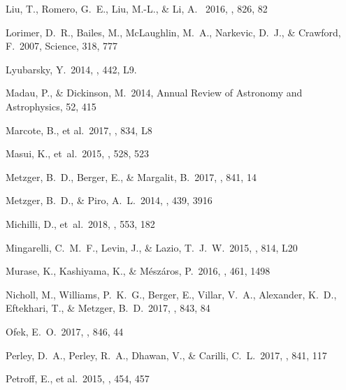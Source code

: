 \documentclass[]{pasj01}
\begin{document}
\begin{thebibliography}{10}
{Liu}, T., {Romero}, G.~E., {Liu}, M.-L., \& {Li}, A. \ 2016, \apj, 826, 82

{Lorimer}, D.~R., {Bailes}, M., {McLaughlin}, M.~A., {Narkevic}, D.~J., \& {Crawford}, F.\ 2007, Science, 318, 777

{Lyubarsky}, Y.\ 2014, \mnras, 442, L9.


{Madau}, P., \& {Dickinson}, M.\ 2014, Annual Review of Astronomy and Astrophysics, 52, 415

{Marcote}, B., et al.\ 2017, \aplett, 834, L8


{Masui}, K., et~al.\ 2015, \nat, 528, 523

{Metzger}, B.~D., {Berger}, E., \& {Margalit}, B.\ 2017, \apj, 841, 14

{Metzger}, B.~D., \& {Piro}, A.~L.\ 2014, \mnras, 439, 3916

{Michilli}, D., et~al.\ 2018, \nat, 553, 182

{Mingarelli}, C.~M.~F., {Levin}, J., \& {Lazio}, T.~J.~W.\ 2015, \aplett, 814, L20

{Murase}, K., {Kashiyama}, K., \& {M{\'e}sz{\'a}ros}, P.\ 2016, \mnras, 461, 1498

Nicholl, M., Williams, P.~K.~G., Berger, E., Villar, V.~A., Alexander, K.~D.,
  Eftekhari, T., \& Metzger, B.~D.\ 2017, \apj, 843, 84

{Ofek}, E.~O.\ 2017, \apj, 846, 44

Perley, D.~A., Perley, R.~A., Dhawan, V., \& Carilli, C.~L.\ 2017, \apj, 841, 117

{Petroff}, E., et al.\ 2015, \mnras, 454, 457


\end{thebibliography}
\end{document}
